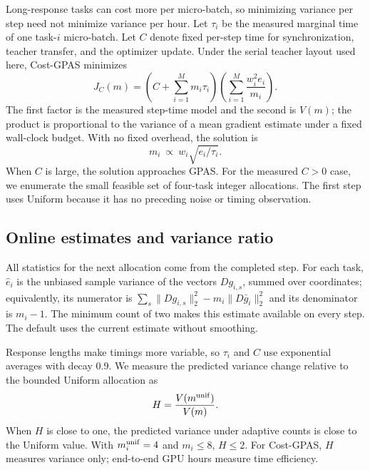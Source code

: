 Long-response tasks can cost more per micro-batch, so minimizing variance per
step need not minimize variance per hour. Let $\tau_i$ be the measured marginal
time of one task-$i$ micro-batch. Let $C$ denote fixed per-step time for
synchronization, teacher transfer, and the optimizer update. Under the serial
teacher layout used here, Cost-GPAS minimizes
\begin{equation}
    J_C(m)=\left(C+\sum_{i=1}^M m_i\tau_i\right)
           \left(\sum_{i=1}^M\frac{w_i^2e_i}{m_i}\right).
    \label{eq:batch_cost_objective}
\end{equation}
The first factor is the measured step-time model and the second is $V(m)$; the
product is proportional to the variance of a mean gradient estimate under a
fixed wall-clock budget. With no fixed overhead, the solution is
\[
    m_i\ \propto\ w_i\sqrt{e_i/\tau_i}.
\]
When $C$ is large, the solution approaches GPAS. For the measured $C>0$ case,
we enumerate the small feasible set of four-task integer allocations. The first
step uses Uniform because it has no preceding noise or timing observation.

\subsection{Online estimates and variance ratio}

All statistics for the next allocation come from the completed step. For each
task, $\widehat e_i$ is the unbiased sample variance of the vectors $Dg_{i,s}$,
summed over coordinates; equivalently, its numerator is
$\sum_s\|Dg_{i,s}\|_2^2-m_i\|D\bar g_i\|_2^2$ and its denominator is
$m_i-1$. The minimum count of two makes this estimate available on every step.
The default uses the current estimate without smoothing.

Response lengths make timings more variable, so $\tau_i$ and $C$ use
exponential averages with decay $0.9$. We measure the predicted variance change
relative to the bounded Uniform allocation as
\begin{equation}
    H=\frac{V(m^{\rm unif})}{V(m)}.
    \label{eq:allocation_variance_ratio}
\end{equation}
When $H$ is close to one, the predicted variance under adaptive counts is close
to the Uniform value. With $m_i^{\rm unif}=4$ and $m_i\leq8$, $H\leq2$. For
Cost-GPAS, $H$ measures variance only; end-to-end GPU hours measure time
efficiency.

